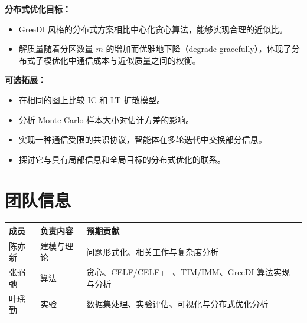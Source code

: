 \documentclass[UTF8, 10pt]{ctexart}
\begin{document}
\textbf{分布式优化目标：}
\begin{itemize}
    \item GreeDI 风格的分布式方案相比中心化贪心算法，能够实现合理的近似比。
    \item 解质量随着分区数量 $m$ 的增加而优雅地下降（degrade gracefully），体现了分布式子模优化中通信成本与近似质量之间的权衡。
\end{itemize}

\textbf{可选拓展：}
\begin{itemize}
    \item 在相同的图上比较 IC 和 LT 扩散模型。
    \item 分析 Monte Carlo 样本大小对估计方差的影响。
    \item 实现一种通信受限的共识协议，智能体在多轮迭代中交换部分信息。
    \item 探讨它与具有局部信息和全局目标的分布式优化的联系。
\end{itemize}

\section{团队信息}

\begin{tabular}{@{}lll@{}}
\toprule
成员 & 负责内容 & 预期贡献 \\
\midrule
陈亦新 & 建模与理论 & 问题形式化、相关工作与复杂度分析 \\
张弼弛 & 算法 & 贪心、CELF/CELF++、TIM/IMM、GreeDI 算法实现与分析 \\
叶瑶勤 & 实验 & 数据集处理、实验评估、可视化与分布式优化分析 \\
\bottomrule
\end{tabular}

\begin{footnotesize}


\end{footnotesize}
\end{document}
